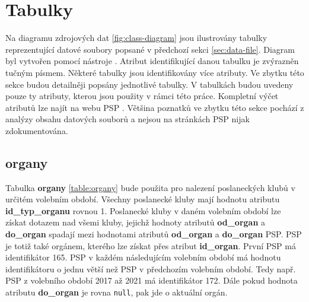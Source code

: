 \section{Tabulky}
\label{sec:db-tables}

Na diagramu zdrojových dat \ref{fig:class-diagram} jsou ilustrovány tabulky reprezentující datové soubory popsané \linebreak v předchozí sekci \ref{sec:data-file}. Diagram byl vytvořen pomocí nástroje \cite{app-diagram}. Atribut identifikující danou tabulku je zvýrazněn tučným písmem. Některé tabulky jsou identifikovány více atributy. Ve zbytku této sekce budou detailněji popsány jednotlivé tabulky. V tabulkách budou uvedeny pouze ty atributy, kterou jsou použity v rámci této práce. Kompletní výčet atributů lze najít na webu PSP \cite{psp-data}. Většina poznatků ve zbytku této sekce pochází z analýzy obsahu datových souborů a nejsou na stránkách PSP nijak zdokumentována.

\subsection*{organy}
Tabulka \textbf{organy} \ref{table:organy} bude použita pro nalezení poslaneckých klubů v určitém volebním období. Všechny poslanecké kluby mají hodnotu atributu \textbf{id\_typ\_organu} rovnou 1. Poslanecké kluby \linebreak v daném volebním období lze získat dotazem nad všemi kluby, jejichž hodnoty atributů \linebreak \textbf{od\_organ} a \textbf{do\_organ} spadají mezi hodnotami atributů \textbf{od\_organ} a \textbf{do\_organ} PSP. PSP je totiž také orgánem, kterého lze získat přes atribut \textbf{id\_organ}. První PSP má identifikátor 165. PSP v každém následujícím volebním období má hodnotu identifikátoru o jednu větší než PSP \linebreak v předchozím volebním období. Tedy např. PSP z volebního období 2017 až 2021 má identifikátor 172. Dále pokud hodnota atributu \textbf{do\_organ} je rovna \lstinline|null|, pak jde o aktuální orgán.

